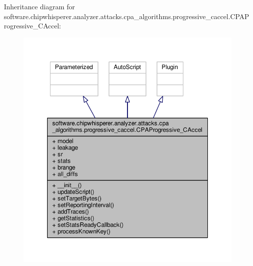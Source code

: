 Inheritance diagram for software.\+chipwhisperer.\+analyzer.\+attacks.\+cpa\+\_\+algorithms.\+progressive\+\_\+caccel.\+C\+P\+A\+Progressive\+\_\+\+C\+Accel\+:\nopagebreak
\begin{figure}[H]
\begin{center}
\leavevmode
\includegraphics[width=347pt]{df/d82/classsoftware_1_1chipwhisperer_1_1analyzer_1_1attacks_1_1cpa__algorithms_1_1progressive__caccel_1515dac6075a482e4db99ceceb3fc38b}
\end{center}
\end{figure}



